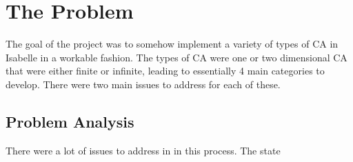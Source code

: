 \chapter{The Problem}

The goal of the project was to somehow implement a variety of types of CA in Isabelle in a workable fashion.
The types of CA were one or two dimensional CA that were either finite or infinite,
leading to essentially 4 main categories to develop.
There were two main issues to address for each of these.

\section{Problem Analysis}

There were a lot of issues to address in in this process.
The state
